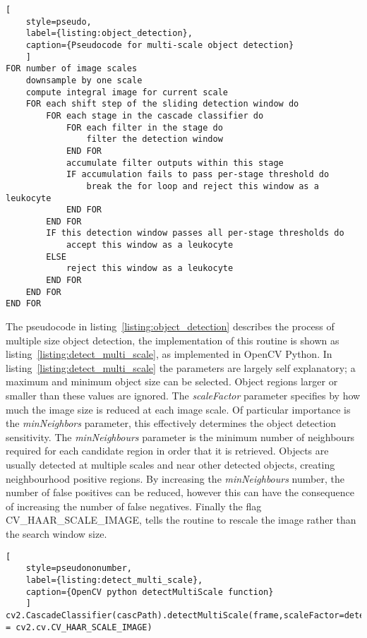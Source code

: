 \begin{lstlisting}[
	style=pseudo,
	label={listing:object_detection},
	caption={Pseudocode for multi-scale object detection}
	]
FOR number of image scales
	downsample by one scale
	compute integral image for current scale
	FOR each shift step of the sliding detection window do
		FOR each stage in the cascade classifier do
			FOR each filter in the stage do
				filter the detection window
			END FOR
			accumulate filter outputs within this stage
			IF accumulation fails to pass per-stage threshold do
				break the for loop and reject this window as a leukocyte
			END FOR
		END FOR
		IF this detection window passes all per-stage thresholds do
			accept this window as a leukocyte
		ELSE
			reject this window as a leukocyte
		END FOR
	END FOR
END FOR
\end{lstlisting}
The pseudocode in listing~\ref{listing:object_detection} describes the process of multiple size object detection, the implementation of this routine is shown as listing~\ref{listing:detect_multi_scale}, as implemented in OpenCV Python. In listing~\ref{listing:detect_multi_scale} the parameters are largely self explanatory; a maximum and minimum object size can be selected. Object regions larger or smaller than these values are ignored. The \emph{scaleFactor} parameter specifies by how much the image size is reduced at each image scale. Of particular importance is the \emph{minNeighbors} parameter, this effectively determines the object detection sensitivity. The \emph{minNeighbours} parameter is the minimum number of neighbours required for each candidate region in order that it is retrieved. Objects are usually detected at multiple scales and near other detected objects, creating neighbourhood positive regions. By increasing the \emph{minNeighbours} number, the number of false positives can be reduced, however this can have the consequence of increasing the number of false negatives. Finally the flag CV\_HAAR\_SCALE\_IMAGE, tells the routine to rescale the image rather than the search window size.

\begin{lstlisting}[
	style=pseudononumber,
	label={listing:detect_multi_scale},
	caption={OpenCV python detectMultiScale function}
	]
cv2.CascadeClassifier(cascPath).detectMultiScale(frame,scaleFactor=detectParticlesScaleFactor,minNeighbors=detectParticlesMinNeighbors,minSize=detectParticlesMinSize,maxSize=detectParticlesMaxSize,flags = cv2.cv.CV_HAAR_SCALE_IMAGE)
\end{lstlisting}

